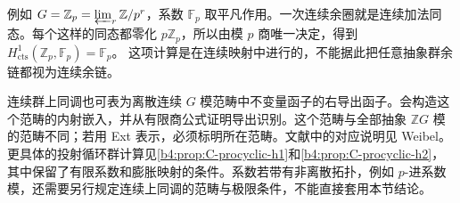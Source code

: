 例如 \(G=\mathbb Z_p=\varprojlim_r\mathbb Z/p^r\)，系数 \(\mathbb F_p\) 取平凡作用。一次连续余圈就是连续加法同态。每个这样的同态都零化 \(p\mathbb Z_p\)，所以由模 \(p\) 商唯一决定，得到
\(H_{\mathrm{cts}}^1(\mathbb Z_p,\mathbb F_p)=\mathbb F_p\)。
这项计算是在连续映射中进行的，不能据此把任意抽象群余链都视为连续余链。

\ProseParagraphBreak
连续群上同调也可表为离散连续 \(G\) 模范畴中不变量函子的右导出函子。会构造这个范畴的内射嵌入，并从有限商公式证明导出识别。这个范畴与全部抽象 \(\mathbb ZG\) 模的范畴不同；若用 Ext 表示，必须标明所在范畴。文献中的对应说明见 Weibel\cite[Definition 6.11.8, Lemma 6.11.10, Profinite Cohomology 6.11.11, Theorem 6.11.13]{Weibel1994HomologicalAlgebra}。更具体的投射循环群计算见\cref{b4:prop:C-procyclic-h1}和\cref{b4:prop:C-procyclic-h2}，其中保留了有限系数和膨胀映射的条件。系数若带有非离散拓扑，例如 \(p\)-进系数模，还需要另行规定连续上同调的范畴与极限条件，不能直接套用本节结论。
